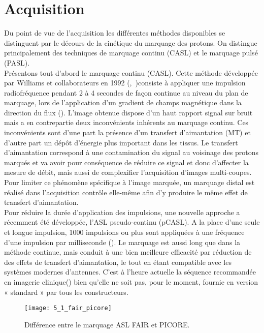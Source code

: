 \section{Acquisition}
Du point de vue de l’acquisition les différentes méthodes disponibles se distinguent par le décours de la cinétique du marquage des protons. On distingue principalement des techniques de marquage continu (CASL) et le marquage pulsé (PASL).\\
Présentons tout d’abord le marquage continu (CASL). Cette méthode développée par Williams et collaborateurs en 1992  (\cite{Detre1992},~\cite{Williams1992})consiste à appliquer une impulsion radiofréquence pendant 2 à 4 secondes de façon continue au niveau du plan de marquage, lors de l’application d’un gradient de champs magnétique dans la direction du flux (\cite{Ferre2011}). L’image obtenue dispose d’un haut rapport signal sur bruit mais a en contrepartie deux inconvénients inhérents au marquage continu. Ces inconvénients sont d’une part la présence d’un transfert d’aimantation (MT) et d’autre part un dépôt d’énergie plus important dans les tissus. Le transfert d’aimantation correspond à une contamination du signal au voisinage des protons marqués et va avoir pour conséquence de réduire ce signal et donc d’affecter la mesure de débit, mais aussi de complexifier l’acquisition d’images multi-coupes. Pour limiter ce phénomène spécifique à l’image marquée, un marquage distal est réalisé dans l’acquisition contrôle elle-même afin d’y produire le même effet de transfert d’aimantation.\\
Pour réduire la durée d’application des impulsions, une nouvelle approche a récemment été développée, l’ASL pseudo-continu (pCASL). A la place d’une seule et longue impulsion, 1000 impulsions ou plus sont appliquées à une fréquence d’une impulsion par milliseconde (\cite{Dai2008}). Le marquage est aussi long que dans la méthode continue, mais conduit à une bien meilleure efficacité par réduction de des effets de transfert d’aimantation, le tout en étant compatible avec les systèmes modernes d’antennes. C’est à l’heure actuelle la séquence recommandée en imagerie clinique(\cite{Alsop2014}) bien qu’elle ne soit pas, pour le moment, fournie en version « standard » par tous les constructeurs.\\
\begin{figure}[!t]
\centering
\texttt{[image: 5\_1\_fair\_picore]}
\caption{Différence entre le marquage ASL FAIR et PICORE.}
\label{fig:5_1_fair_picore}	
\end{figure}
